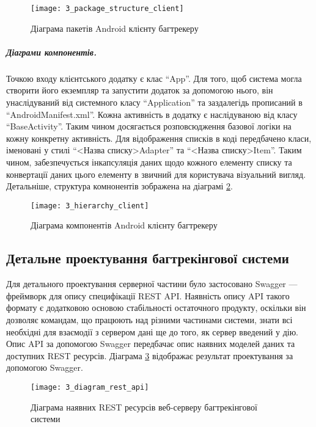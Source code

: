 \documentclass[../main.tex]{subfiles}
\begin{document}
			\begin{figure}[H]
				\centering
				\texttt{[image: 3\_package\_structure\_client]}
				\caption{Діаграма пакетів Android клієнту багтрекеру}
				\label{client_packages}
			\end{figure}
		
		\subparagraph{Діаграми компонентів.}
		
			Точкою входу клієнтського додатку є клас \enquote{App}. Для того, щоб система могла створити його екземпляр та запустити додаток за допомогою нього, він унаслідуваний від системного класу \enquote{Application} та заздалегідь прописаний в \enquote{AndroidManifest.xml}. Кожна активність в додатку є наслідуваною від класу \enquote{BaseActivity}. Таким чином досягається розповсюдження базової логіки на кожну конкретну активність. Для відображення списків в коді передбачено класи, іменовані у стилі \enquote{<Назва списку>Adapter} та \enquote{<Назва списку>Item}. Таким чином, забезпечується інкапсуляція даних щодо кожного елементу списку та конвертації даних цього елементу в звичний для користувача візуальний вигляд. Детальніше, структура комнонентів зображена на діаграмі \ref{client_components}.
			
			\begin{figure}[H]
				\centering
				\texttt{[image: 3\_hierarchy\_client]}
				\caption{Діаграма компонентів Android клієнту багтрекеру}
				\label{client_components}
			\end{figure}
	
	\subsection{Детальне проектування багтрекінгової системи}
	
		Для детального проектування серверної частини було застосовано Swagger — фреймворк для опису специфікації REST API. Наявність опису API такого формату є додатковою основою стабільності остаточного продукту, оскільки він дозволяє командам, що працюють над різними частинами системи, знати всі необхідні для взаємодії з сервером дані ще до того, як сервер введений у дію. Опис API за допомогою Swagger передбачає опис наявних моделей даних та доступних REST ресурсів. Діаграма \ref{available_rest_resources} відображає результат проектування за допомогою Swagger.
		
		\begin{figure}[H]
			\centering
			\texttt{[image: 3\_diagram\_rest\_api]}
			\caption{Діаграма наявних REST ресурсів веб-серверу багтрекінгової системи}
			\label{available_rest_resources}
		\end{figure}
		
\end{document}
